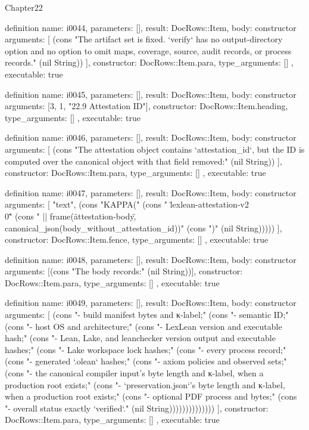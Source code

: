 \begin{lexlean}{Chapter22}
\begin{semanticmodule}
definition{
  name: i0044,
  parameters: [],
  result: DocRows::Item,
  body: constructor{
    arguments: [
      (cons "The artifact set is fixed. `verify` has no output-directory option and no option to omit maps, coverage, source, audit records, or process records." (nil String))
    ],
    constructor: DocRows::Item.para,
    type_arguments: []
  },
  executable: true
}

definition{
  name: i0045,
  parameters: [],
  result: DocRows::Item,
  body: constructor{
    arguments: [3, 1, "22.9 Attestation ID"],
    constructor: DocRows::Item.heading,
    type_arguments: []
  },
  executable: true
}

definition{
  name: i0046,
  parameters: [],
  result: DocRows::Item,
  body: constructor{
    arguments: [
      (cons "The attestation object contains `attestation_id`, but the ID is computed over the canonical object with that field removed:" (nil String))
    ],
    constructor: DocRows::Item.para,
    type_arguments: []
  },
  executable: true
}

definition{
  name: i0047,
  parameters: [],
  result: DocRows::Item,
  body: constructor{
    arguments: [
      "text",
      (cons "KAPPA(" (cons "  \"lexlean-attestation-v2\\0\"" (cons "  || frame(\"attestation-body\", canonical_json(body_without_attestation_id))" (cons ")" (nil String)))))
    ],
    constructor: DocRows::Item.fence,
    type_arguments: []
  },
  executable: true
}

definition{
  name: i0048,
  parameters: [],
  result: DocRows::Item,
  body: constructor{
    arguments: [(cons "The body records:" (nil String))],
    constructor: DocRows::Item.para,
    type_arguments: []
  },
  executable: true
}

definition{
  name: i0049,
  parameters: [],
  result: DocRows::Item,
  body: constructor{
    arguments: [
      (cons "- build manifest bytes and κ-label;" (cons "- semantic ID;" (cons "- host OS and architecture;" (cons "- LexLean version and executable hash;" (cons "- Lean, Lake, and leanchecker version output and executable hashes;" (cons "- Lake workspace lock hashes;" (cons "- every process record;" (cons "- generated `.olean` hashes;" (cons "- axiom policies and observed sets;" (cons "- the canonical compiler input's byte length and κ-label, when a production root exists;" (cons "- `preservation.json`'s byte length and κ-label, when a production root exists;" (cons "- optional PDF process and bytes;" (cons "- overall status exactly `verified`." (nil String))))))))))))))
    ],
    constructor: DocRows::Item.para,
    type_arguments: []
  },
  executable: true
}


\end{semanticmodule}
\end{lexlean}
